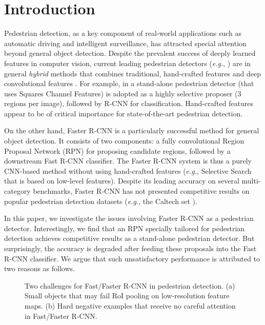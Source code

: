 \documentclass[runningheads]{llncs}
\def\eg{\emph{e.g.}}
\begin{document}
\section{Introduction}

Pedestrian detection, as a key component of real-world applications such as automatic driving and intelligent surveillance, has attracted special attention beyond general object detection. Despite the prevalent success of deeply learned features in computer vision, current leading pedestrian detectors (\eg, \cite{hosang2015taking,tian2015pedestrian,tian2015deep,cai2015learning}) are in general \emph{hybrid} methods that combines traditional, hand-crafted features \cite{dollar2009integral,dollar2014fast} and deep convolutional features \cite{krizhevsky2012imagenet,simonyan2014very}. For example, in \cite{hosang2015taking} a stand-alone pedestrian detector \cite{benenson2014ten} (that uses Squares Channel Features) is adopted as a highly selective proposer (3 regions per image), followed by R-CNN \cite{girshick2014rich} for classification. Hand-crafted features appear to be of critical importance for state-of-the-art pedestrian detection.

On the other hand, Faster R-CNN \cite{ren2015faster} is a particularly successful method for general object detection. It consists of two components: a fully convolutional Region Proposal Network (RPN) for proposing candidate regions, followed by a downstream Fast R-CNN \cite{girshickICCV15fastrcnn} classifier. The Faster R-CNN system is thus a purely CNN-based method without using hand-crafted features (\eg, Selective Search \cite{uijlings2013selective} that is based on low-level features). Despite its leading accuracy on several multi-category benchmarks, Faster R-CNN has not presented competitive results on popular pedestrian detection datasets (\eg, the Caltech set \cite{dollar2012pedestrian}).

In this paper, we investigate the issues involving Faster R-CNN as a pedestrian detector. Interestingly, we find that an RPN specially tailored for pedestrian detection achieves competitive results as a stand-alone pedestrian detector. But surprisingly, the accuracy is degraded after feeding these proposals into the Fast R-CNN classifier. We argue that such unsatisfactory performance is attributed to two reasons as follows.

\begin{figure}[t] \centering
{}
\caption{Two challenges for Fast/Faster R-CNN in pedestrian detection. (a) Small objects that may fail RoI pooling on low-resolution feature maps. (b) Hard negative examples that receive no careful attention in Fast/Faster R-CNN.}
\label{fig:hard-neg-example}
\end{figure}
\end{document}
